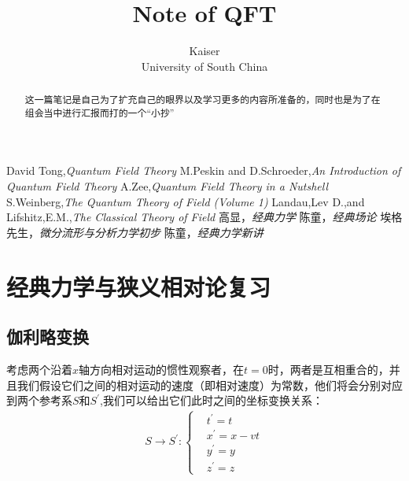 \documentclass{article}
\title{Note of QFT}
\author{Kaiser\\University of South China}
\begin{document}
\maketitle

\begin{abstract}
    \normalsize
    这一篇笔记是自己为了扩充自己的眼界以及学习更多的内容所准备的，同时也是为了在组会当中进行汇报而打的一个“小抄”
\end{abstract}

\begin{center}
    \large
    \begin{thebibliography}{99} 
         David Tong,\textit{Quantum Field Theory}
         M.Peskin and D.Schroeder,\textit{An Introduction of Quantum Field Theory}
         A.Zee,\textit{Quantum Field Theory in a Nutshell}
         S.Weinberg,\textit{The Quantum Theory of Field (Volume 1)}
         Landau,Lev D.,and Lifshitz,E.M.,\textit{The Classical Theory of Field}
         高显，\textit{经典力学}
         陈童，\textit{经典场论}
         埃格先生，\textit{微分流形与分析力学初步}
         陈童，\textit{经典力学新讲}
    \end{thebibliography}
\end{center}




\begin{center}
    \tableofcontents
\end{center}
\newpage





\section{经典力学与狭义相对论复习}

\subsection{伽利略变换}
考虑两个沿着$x$轴方向相对运动的惯性观察者，在$t=0$时，两者是互相重合的，并且我们假设它们之间的相对运动的速度（即相对速度）为常数，他们将会分别对应到两个参考系$S$和$S^\prime$,我们可以给出它们此时之间的坐标变换关系：
\begin{align*}
    S\to S^\prime:
    \begin{cases}
        &t^\prime=t\\
        &x^\prime=x-vt\\
        &y^\prime=y\\
        &z^\prime=z
    \end{cases}
\end{align*}
\end{document}
